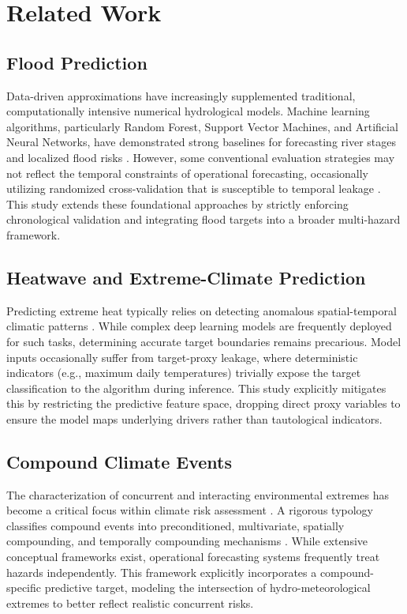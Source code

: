 \section{Related Work}
\label{sec:related_work}

\subsection{Flood Prediction}
Data-driven approximations have increasingly supplemented traditional, computationally intensive numerical hydrological models. Machine learning algorithms, particularly Random Forest, Support Vector Machines, and Artificial Neural Networks, have demonstrated strong baselines for forecasting river stages and localized flood risks \cite{Mosavi2018}. However, some conventional evaluation strategies may not reflect the temporal constraints of operational forecasting, occasionally utilizing randomized cross-validation that is susceptible to temporal leakage \cite{Kaufman2012}. This study extends these foundational approaches by strictly enforcing chronological validation and integrating flood targets into a broader multi-hazard framework.

\subsection{Heatwave and Extreme-Climate Prediction}
Predicting extreme heat typically relies on detecting anomalous spatial-temporal climatic patterns \cite{Chattopadhyay2020}. While complex deep learning models are frequently deployed for such tasks, determining accurate target boundaries remains precarious. Model inputs occasionally suffer from target-proxy leakage, where deterministic indicators (e.g., maximum daily temperatures) trivially expose the target classification to the algorithm during inference. This study explicitly mitigates this by restricting the predictive feature space, dropping direct proxy variables to ensure the model maps underlying drivers rather than tautological indicators.

\subsection{Compound Climate Events}
The characterization of concurrent and interacting environmental extremes has become a critical focus within climate risk assessment \cite{Zscheischler2018}. A rigorous typology classifies compound events into preconditioned, multivariate, spatially compounding, and temporally compounding mechanisms \cite{Zscheischler2020}. While extensive conceptual frameworks exist, operational forecasting systems frequently treat hazards independently. This framework explicitly incorporates a compound-specific predictive target, modeling the intersection of hydro-meteorological extremes to better reflect realistic concurrent risks.

